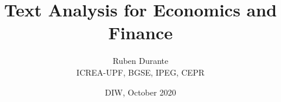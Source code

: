 \documentclass[english]{beamer}
\begin{document}
\title{\textcolor{blue(pigment)}{Text Analysis for Economics and Finance}}
\vspace{8pt} 
\author{Ruben Durante\\
\small{ICREA-UPF, BGSE, IPEG, CEPR}}
\date{\small{DIW, October 2020}}

\frame{\titlepage}


\end{document}
